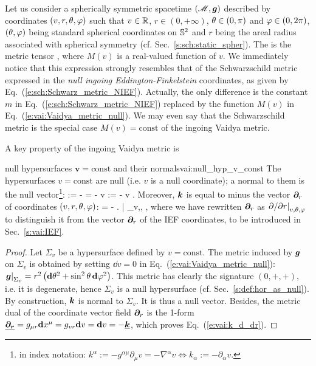 Let us consider a spherically symmetric spacetime $(\mathscr{M},\bm{g})$ described by
coordinates $(v,r,\theta,\varphi)$ such that $v\in \mathbb{R}$, $r\in(0, +\infty)$,
$\theta\in(0,\pi)$ and $\varphi\in(0,2\pi)$, $(\theta,\varphi)$ being standard
spherical coordinates on $\mathbb{S}^2$ and $r$ being the areal radius associated
with spherical symmetry (cf. Sec.~\ref{s:sch:static_spher}).
The 
is the metric tensor
\be \label{e:vai:Vaidya_metric_null}
     ,
\ee
where $M(v)$ is a real-valued function of $v$.
We immediately notice that this expression strongly resembles that
of the Schwarzschild metric expressed in the
\emph{null ingoing Eddington-Finkelstein}
coordinates, as given by Eq.~(\ref{e:sch:Schwarz_metric_NIEF}). Actually, the
only difference is the constant $m$ in Eq.~(\ref{e:sch:Schwarz_metric_NIEF})
replaced by the function $M(v)$ in Eq.~(\ref{e:vai:Vaidya_metric_null}).
We may even say that the Schwarzschild metric is the special case $M(v) = \mathrm{const}$ of
the ingoing Vaidya metric.

A key property of the ingoing Vaidya metric is
\begin{tprop}{null hypersurfaces $\bm{v = \mathrm{const}}$ and their normals}{vai:null_hyp_v_const}
The hypersurfaces $v = \mathrm{const}$ are null (i.e. $v$ is a null coordinate);
a normal to them is the null
vector\footnote{in index notation: $k^\alpha := - g^{\alpha\mu} \partial_\mu v = - \nabla^\alpha v \iff
k_\alpha := - \partial_\alpha v $.}:
\be \label{e:vai:def_k}
     := -  = - \vw{\nabla} v \quad\iff\quad
     := - \dd v .
\ee
Moreover, $\bm{k}$ is equal to minus the vector $\bm{\partial}_r$ of coordinates
$(v,r,\theta,\varphi)$:
\be \label{e:vai:k_d_dr}
     = - \left.  \right| _{v,\th,\ph} ,
\ee
where we have rewritten $\bm{\partial}_r$ as $\left. {\partial }/{\partial r} \right| _{v,\theta,\varphi}$
to distinguish it from the vector $\bm{\partial}_r$ of the IEF coordinates, to be
introduced in Sec.~\ref{s:vai:IEF}.
\end{tprop}

\begin{proof}
Let $\Sigma_v$ be a hypersurface defined by $v = \mathrm{const}$.
The metric induced by $\bm{g}$ on $\Sigma_v$
is obtained by setting $\dd v = 0$ in Eq.~(\ref{e:vai:Vaidya_metric_null}):
$\left.\bm{g}\right| _{\Sigma_v} = r^2 \left( \mathbf{d}\theta^2 + \sin^2\theta\, \mathbf{d}\varphi^2 \right)$.
This metric has clearly the signature $(0, +, +)$, i.e. it is degenerate, hence
$\Sigma_v$ is a null hypersurface (cf. Sec.~\ref{s:def:hor_as_null}).
By construction, $\bm{k}$ is normal to $\Sigma_v$. It is thus a null vector.
Besides, the metric dual of
the coordinate vector field $\bm{\partial}_r$ is the 1-form
$\underline{\bm{\bm{\partial}_r}} = g_{\mu r}\mathbf{d} x^\mu = g_{vr} \mathbf{d} v = \mathbf{d} v = - \underline{\bm{k}}$,
which proves Eq.~(\ref{e:vai:k_d_dr}).
\end{proof}

